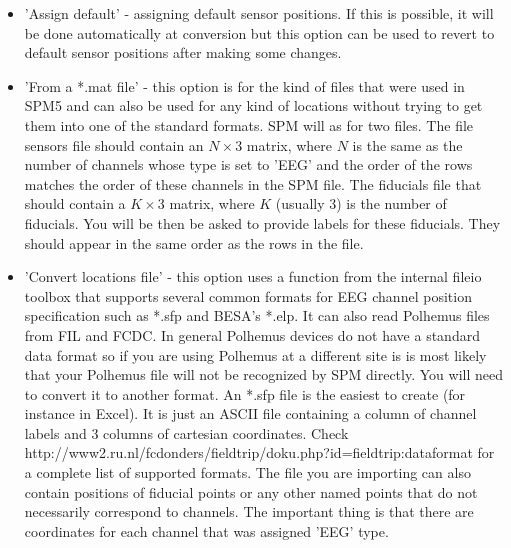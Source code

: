 \begin{itemize}
\item	'Assign default' - assigning default sensor positions. If 
  this is possible, it will be done automatically at conversion
  but this option can be used to revert to default sensor positions 
  after making some changes. 

\item 'From a *.mat file' - this option is for the kind of files that
  were used in SPM5 and can also be used for any kind of locations without
  trying to get them into one of the standard formats. SPM will as for two 
  files. The file sensors file should contain an $N \times 3$ matrix, 
  where $N$ is the same as the number of channels whose type is set to 'EEG'
  and the order of the rows matches the order of these channels in the SPM file. 
  The fiducials file  that should contain a $K \times 3$ matrix, where $K$ 
  (usually 3) is the number of fiducials.  You will be then be asked to provide
  labels for these fiducials. They should appear in the same order as the rows
  in the file.

\item	'Convert locations file' - this option uses a function from
  the internal fileio toolbox that supports several common formats for
  EEG channel position specification such as *.sfp and
  BESA's *.elp. It can also read Polhemus files from FIL and FCDC. In general
  Polhemus devices do not have a standard data format so if you are using Polhemus
  at a different site is is most likely that your Polhemus file will not be recognized
  by SPM directly. You will need to convert it to another format.
  An *.sfp file is the easiest to create (for instance in Excel).
  It is just an ASCII file containing a column of
  channel labels and 3 columns of cartesian coordinates.
  Check http://www2.ru.nl/fcdonders/fieldtrip/doku.php?id=fieldtrip:dataformat
  for a complete list of supported formats. The file you are importing can also
  contain positions of fiducial points or any other named points that do not
  necessarily correspond to channels. The important thing is that there are
  coordinates for each channel that was assigned 'EEG' type. 

\end{itemize}



